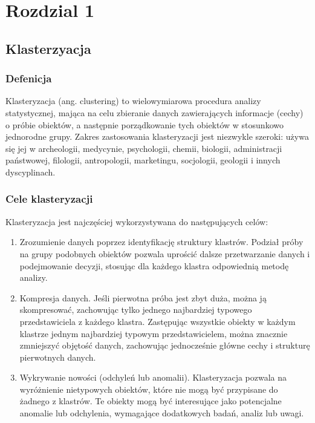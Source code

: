 \chapter{Rozdzial 1}

\section{Klasterzyacja}

	\subsection{Defenicja}
		Klasteryzacja (ang. clustering) to wielowymiarowa procedura analizy statystycznej, mająca na celu zbieranie danych zawierających informacje (cechy) o próbie obiektów, a następnie porządkowanie tych obiektów w stosunkowo jednorodne grupy. Zakres zastosowania klasteryzacji jest niezwykle szeroki: używa się jej w archeologii, medycynie, psychologii, chemii, biologii, administracji państwowej, filologii, antropologii, marketingu, socjologii, geologii i innych dyscyplinach. \cite{Clustering}
	
	\subsection{Cele klasteryzacji}
		Klasteryzacja jest najczęściej wykorzystywana do następujących celów:
		\begin{enumerate}
			\item Zrozumienie danych poprzez identyfikację struktury klastrów. Podział próby na grupy podobnych obiektów pozwala uprościć dalsze przetwarzanie danych i podejmowanie decyzji, stosując dla każdego klastra odpowiednią metodę analizy.
			\item Kompresja danych. Jeśli pierwotna próba jest zbyt duża, można ją skompresować, zachowując tylko jednego najbardziej typowego przedstawiciela z każdego klastra. Zastępując wszystkie obiekty w każdym klastrze jednym najbardziej typowym przedstawicielem, można znacznie zmniejszyć objętość danych, zachowując jednocześnie główne cechy i strukturę pierwotnych danych.
			\item Wykrywanie nowości (odchyleń lub anomalii). Klasteryzacja pozwala na wyróżnienie nietypowych obiektów, które nie mogą być przypisane do żadnego z klastrów. Te obiekty mogą być interesujące jako potencjalne anomalie lub odchylenia, wymagające dodatkowych badań, analiz lub uwagi.
		\end{enumerate}
	
